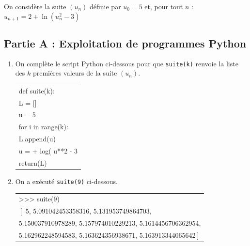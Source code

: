 \medskip
	On considère la suite $(u_{n})$ définie par $u_{0}=5$ et, pour tout $n$ :
$u_{n+1}=2+\ln \left(u_{n}^{2}-3\right)$



	\subsection*{Partie A : Exploitation de programmes Python}

	\begin{enumerate}
		\item On complète le script Python ci-dessous pour que \texttt{suite(k)}  renvoie la liste des $k$ premières valeurs de la suite $(u_{n})$.





		\begin{center}
		\begin{ttfamily}
		\begin{tabularx}{0.6\linewidth}{|X|}\hline
			def suite(k):\\
			\quad	L = []\\
			\quad	u = 5\\
			\quad	for i in range({\blue k}):\\
			\qquad	L.append(u)\\
			\qquad	u = \blue 2 + log( u**2 - 3\\
			\quad	return({\blue L})\\ \hline
		\end{tabularx}
		\end{ttfamily}
		\end{center}
		
		\item On a exécuté \texttt{suite(9)} ci-dessous. 
		


\begin{center}
\begin{ttfamily}
		
\begin{tabularx}{\linewidth}{|X|}\hline
>{}>{}>{} suite(9) \\
$\left[\right.$ 5, 5.091042453358316, 5.131953749864703,\\
5.150037910978289, 5.157974010229213, 5.1614456706362954,\\
5.162962248594583, 5.163624356938671, 5.163913344065642$\left.\right]$\\ \hline

\end{tabularx}
\end{ttfamily}
\end{center}


\end{enumerate}

